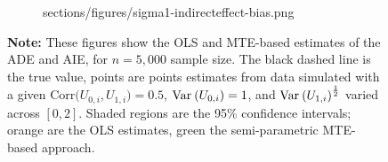 \begin{figure}[h!]
\begin{subfigure}[c]{0.475\textwidth}
{            sections/figures/sigma1-indirecteffect-bias.png}
    \end{subfigure}
    \label{fig:sigma-1-bias}
    \justify
    \footnotesize    
    \textbf{Note:}
    These figures show the OLS and MTE-based estimates of the ADE and AIE, for $n = 5,000$ sample size.
    The black dashed line is the true value, points are points estimates from data simulated with a given $\text{Corr}\big(U_{0,i}, U_{1,i}\big) =0.5$, $\text{Var}_{} \left( U_{0,i} \right) = 1$, and $\text{Var}_{} \left( U_{1,i} \right)^{\frac12}$ varied across $[0, 2]$.
    Shaded regions are the 95\% confidence intervals;
    orange are the OLS estimates, green the semi-parametric MTE-based approach.
\end{figure}

%
